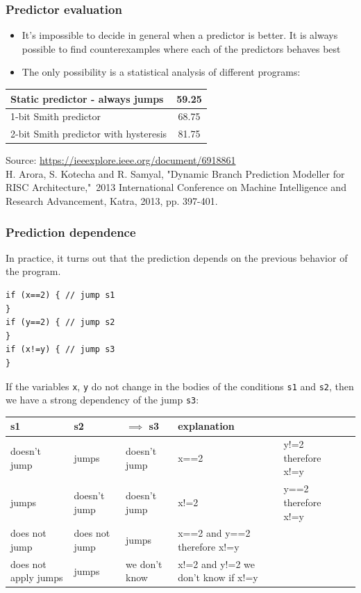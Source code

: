 \documentclass{beamer}
\begin{document}
\begin{frame}
\frametitle{Predictor evaluation}

\begin{itemize}
\item It's impossible to decide in general when a predictor is better. It is always possible to find counterexamples where each of the predictors behaves best
\item The only possibility is a statistical analysis of different programs:
\end{itemize}
\begin{center}
\begin{tabular}{|l|c|} \hline
Static predictor - always jumps & 59.25 \\\hline
1-bit Smith predictor & 68.75 \\\hline
2-bit Smith predictor with hysteresis & 81.75 \\\hline
\end{tabular}
\end{center}

Source: \url{https://ieeexplore.ieee.org/document/6918861}\\
H. Arora, S. Kotecha and R. Samyal, "Dynamic Branch Prediction Modeller for RISC Architecture," 2013 International Conference on Machine Intelligence and Research Advancement, Katra, 2013, pp. 397-401.
\end{frame}

\begin{frame}[fragile]
\frametitle{Prediction dependence}

In practice, it turns out that the prediction depends on the previous behavior of the program.

\begin{verbatim}
if (x==2) { // jump s1
}
if (y==2) { // jump s2
}
if (x!=y) { // jump s3
}
\end{verbatim}

If the variables \texttt{x}, \texttt{y} do not change in the bodies of the conditions \texttt{s1} and \texttt{s2}, then we have a strong dependency of the jump \texttt{s3}:

\bigskip

\begin{tabular}{|l|l|l|l|l|l|}\hline
s1 & s2 & $\implies$ s3 & explanation \\\hline
doesn't jump & jumps & doesn't jump & x==2 & y!=2 therefore x!=y \\\hline
jumps & doesn't jump & doesn't jump & x!=2 & y==2 therefore x!=y \\\hline
does not jump & does not jump & jumps & x==2 and y==2 therefore x!=y\\\hline does not apply
jumps & jumps & we don't know & x!=2 and y!=2 we don't know if x!=y \\\hline
\end{tabular}
\end{frame}
\end{document}
